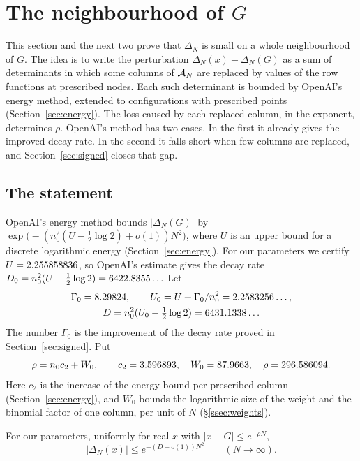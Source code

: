 \section{The neighbourhood of $G$}\label{sec:real}

This section and the next two prove that $\Delta_N$ is small on a whole neighbourhood of $G$. The idea is to
write the perturbation $\Delta_N(x)-\Delta_N(G)$ as a sum of determinants in which some columns of $\mathcal A_N$
are replaced by values of the row functions at prescribed nodes. Each such determinant is bounded by
OpenAI's energy method, extended to configurations with prescribed points (Section~\ref{sec:energy}). The
loss caused by each replaced column, in the exponent, determines $\rho$. OpenAI's method has two cases. In
the first it already gives the improved decay rate. In the second it falls short when few columns are
replaced, and Section~\ref{sec:signed} closes that gap.

\subsection{The statement}
OpenAI's energy method bounds $|\Delta_N(G)|$ by $\exp\bigl(-(n_0^2(U-\frac12\log2)+o(1))N^2\bigr)$, where $U$
is an upper bound for a discrete logarithmic energy (Section~\ref{sec:energy}). For our parameters we
certify $U=2.255858836$, so OpenAI's estimate gives the decay rate $D_0=n_0^2(U-\frac12\log2)=6422.8355\ldots$
Let
\begin{gather*}
 \Gamma_0=8.29824,\qquad U_0=U+\Gamma_0/n_0^2=2.2583256\ldots,\\
 D=n_0^2(U_0-\tfrac12\log2)=6431.1338\ldots
\end{gather*}
The number $\Gamma_0$ is the improvement of the decay rate proved in Section~\ref{sec:signed}. Put
\begin{equation}\label{eq:rho-def}
 \rho=n_0c_2+W_0,\qquad c_2=3.596893,\quad W_0=87.9663,\quad \rho=296.586094 .
\end{equation}
Here $c_2$ is the increase of the energy bound per prescribed column (Section~\ref{sec:energy}), and $W_0$
bounds the logarithmic size of the weight and the binomial factor of one column, per unit of $N$
(\S\ref{ssec:weights}).

\begin{theorem}\label{thm:real}
For our parameters, uniformly for real $x$ with $|x-G|\le e^{-\rho N}$,
\[
 |\Delta_N(x)|\le e^{-(D+o(1))N^2}\qquad(N\to\infty).
\]
\end{theorem}

